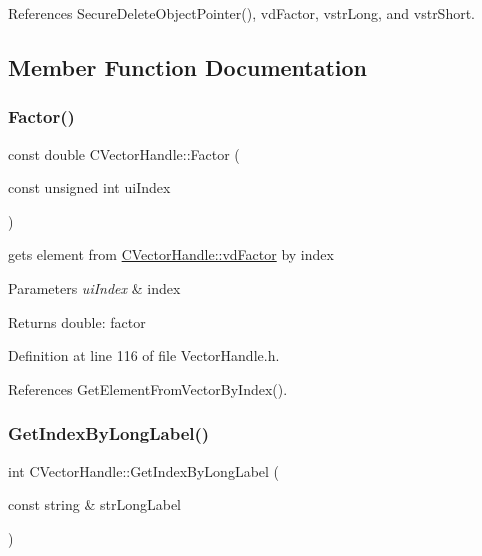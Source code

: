 References Secure\+Delete\+Object\+Pointer(), vd\+Factor, vstr\+Long, and vstr\+Short.



\subsection{Member Function Documentation}
\mbox{\label{classCVectorHandle_ae07ef54ee4ecb2da32176e58cf852e7c}} 
\subsubsection{\texorpdfstring{Factor()}{Factor()}}
{\footnotesize\ttfamily const double C\+Vector\+Handle\+::\+Factor (\begin{DoxyParamCaption}\item[{const unsigned int}]{ui\+Index }\end{DoxyParamCaption})\hspace{0.3cm}{\ttfamily [inline]}}



gets element from \hyperlink{classCVectorHandle_af8f8b2e0da8363e695872ca85f33364e}{C\+Vector\+Handle\+::vd\+Factor} by index 


\begin{DoxyParams}{Parameters}
{\em ui\+Index} & index \\
\hline
\end{DoxyParams}
\begin{DoxyReturn}{Returns}
double\+: factor 
\end{DoxyReturn}


Definition at line 116 of file Vector\+Handle.\+h.



References Get\+Element\+From\+Vector\+By\+Index().

\mbox{\label{classCVectorHandle_a36419c6f77002dde25bfa9e43357bd5c}} 
\subsubsection{\texorpdfstring{Get\+Index\+By\+Long\+Label()}{GetIndexByLongLabel()}}
{\footnotesize\ttfamily int C\+Vector\+Handle\+::\+Get\+Index\+By\+Long\+Label (\begin{DoxyParamCaption}\item[{const string \&}]{str\+Long\+Label }\end{DoxyParamCaption})\hspace{0.3cm}{\ttfamily [inline]}}



